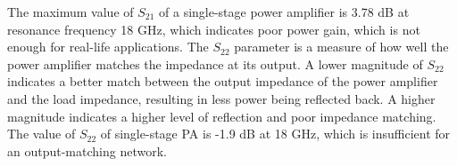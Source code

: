 The maximum value of $S_{21}$ of a single-stage power amplifier is 3.78 dB at resonance frequency 18 GHz, which indicates poor power gain, which is not enough for real-life applications. The $S_{22}$ parameter is a measure of how well the power amplifier matches the impedance at its output. A lower magnitude of 
$S_{22}$ indicates a better match between the output impedance of the power amplifier and the load impedance, resulting in less power being reflected back. A higher magnitude indicates a higher level of reflection and poor impedance matching. The value of $S_{22}$ of single-stage PA is -1.9 dB at 18 GHz, which is insufficient for an output-matching network. 

